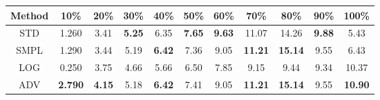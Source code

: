 \documentclass{standalone}
\begin{document}
\begin{tabular}{c|cccccccccc}
      \toprule
      Method & 10\% & 20\% & 30\% & 40\% & 50\% & 60\% & 70\% & 80\% & 90\% & 100\% \\
      \midrule
STD & 1.260 & 3.41 & \textbf{5.25} & 6.35 & \textbf{7.65} & \textbf{9.63} & 11.07 & 14.26 & \textbf{9.88} & 5.43\\
SMPL & 1.290 & 3.44 & 5.19 & \textbf{6.42} & 7.36 & 9.05 & \textbf{11.21} & \textbf{15.14} & 9.55 & 6.43\\
LOG & 0.250 & 3.75 & 4.66 & 5.66 & 6.50 & 7.85 & 9.15 & 9.44 & 9.34 & 10.37\\
ADV & \textbf{2.790} & \textbf{4.15} & 5.18 & \textbf{6.42} & 7.41 & 9.05 & \textbf{11.21} & \textbf{15.14} & 9.55 & \textbf{10.90}\\
  \bottomrule
\end{tabular}
\end{document}
